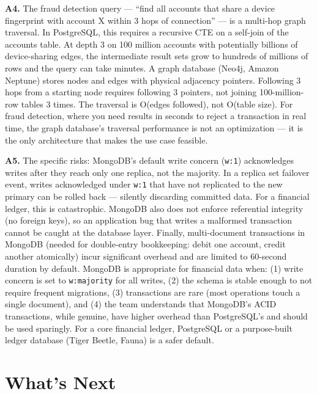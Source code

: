 \documentclass[11pt,a4paper]{article}
\begin{document}
\begin{answerbox}
\bigskip
\textbf{A4.} The fraud detection query --- ``find all accounts that share a device fingerprint with account X within 3 hops of connection'' --- is a multi-hop graph traversal. In PostgreSQL, this requires a recursive CTE on a self-join of the accounts table. At depth 3 on 100 million accounts with potentially billions of device-sharing edges, the intermediate result sets grow to hundreds of millions of rows and the query can take minutes. A graph database (Neo4j, Amazon Neptune) stores nodes and edges with physical adjacency pointers. Following 3 hops from a starting node requires following 3 pointers, not joining 100-million-row tables 3 times. The traversal is O(edges followed), not O(table size). For fraud detection, where you need results in seconds to reject a transaction in real time, the graph database's traversal performance is not an optimization --- it is the only architecture that makes the use case feasible.

\bigskip
\textbf{A5.} The specific risks: MongoDB's default write concern (\texttt{w:1}) acknowledges writes after they reach only one replica, not the majority. In a replica set failover event, writes acknowledged under \texttt{w:1} that have not replicated to the new primary can be rolled back --- silently discarding committed data. For a financial ledger, this is catastrophic. MongoDB also does not enforce referential integrity (no foreign keys), so an application bug that writes a malformed transaction cannot be caught at the database layer. Finally, multi-document transactions in MongoDB (needed for double-entry bookkeeping: debit one account, credit another atomically) incur significant overhead and are limited to 60-second duration by default. MongoDB is appropriate for financial data when: (1) write concern is set to \texttt{w:majority} for all writes, (2) the schema is stable enough to not require frequent migrations, (3) transactions are rare (most operations touch a single document), and (4) the team understands that MongoDB's ACID transactions, while genuine, have higher overhead than PostgreSQL's and should be used sparingly. For a core financial ledger, PostgreSQL or a purpose-built ledger database (Tiger Beetle, Fauna) is a safer default.
\end{answerbox}

\section{What's Next}
\end{document}
